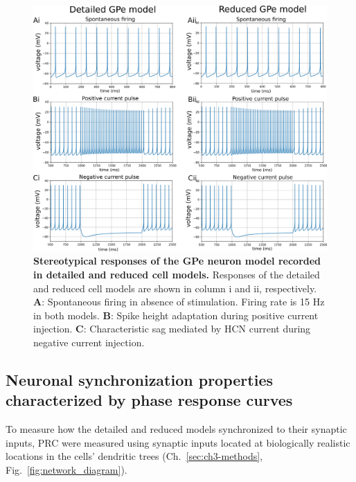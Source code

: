 \begin{figure}[ht]
\centering
\includegraphics[width=\textwidth]{ch_reduced_model/figs/fig_gpe-full-vs-red_protos-clamp.png}
\caption{
\textbf{Stereotypical responses of the \cite{gunay_channel_2008} GPe neuron model recorded in detailed and reduced cell models.}
Responses of the detailed and reduced cell models are shown in column i and ii, respectively.
\textbf{A}: Spontaneous firing in absence of stimulation. Firing rate is 15 Hz in both models.
\textbf{B}: Spike height adaptation during positive current injection.
\textbf{C}: Characteristic sag mediated by HCN current during negative current injection.
}
\label{fig:gpe-full-vs-red_protos-clamp}
\end{figure}

%
%
%
\subsection{Neuronal synchronization properties characterized by phase response curves}
%
%
%
%
%
%
%

%
%

To measure how the detailed and reduced models synchronized to their synaptic inputs, PRC
were measured using synaptic inputs located at biologically realistic locations
in the cells' dendritic trees (Ch.~\ref{sec:ch3-methods}, Fig.~\ref{fig:network_diagram}).
%
%

